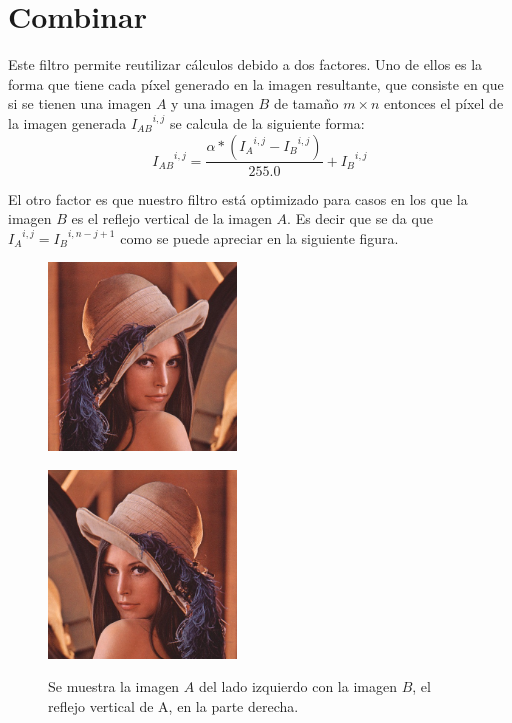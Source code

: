 \section{Combinar}
\par{Este filtro permite reutilizar cálculos debido a dos factores. Uno de ellos es la forma que tiene cada píxel generado en la imagen resultante, que consiste en que si se tienen una imagen $A$ y una imagen $B$ de tamaño $m \times n$ entonces el píxel de la imagen generada ${I_{AB}}^{i, j}$ se calcula de la siguiente forma:}
\[ {I_{AB}}^{i,j} = \dfrac{\alpha * ( {I_{A}}^{i,j} - {I_{B}}^{i,j} )}{255.0} + {I_{B}}^{i,j} \]
\par{El otro factor es que nuestro filtro está optimizado para casos en los que la imagen $B$ es el reflejo vertical de la imagen $A$. Es decir que se da que ${I_{A}}^{i,j} = {I_{B}}^{i,n - j + 1}$ como se puede apreciar en la siguiente figura.}

\begin{figure}[h!]
\centering
\begin{minipage}{.5\textwidth}
\centering
\includegraphics[width=5cm, height=5cm]{CombinarOriginal.jpg}
\label{}
\end{minipage}\hfill
\begin{minipage}{.5\textwidth}
\centering
\includegraphics[width=5cm, height=5cm]{CombinarReflejo.jpg}
\label{}
\end{minipage}
\caption[center]{Se muestra la imagen $A$ del lado izquierdo con la imagen $B$, el reflejo vertical de A, en la parte derecha.}
\end{figure}

